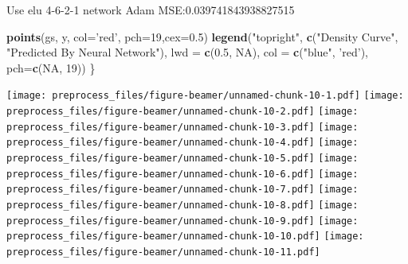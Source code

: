 \documentclass[ignorenonframetext,]{beamer}
\newenvironment{Shaded}{\begin{snugshade}}{\end{snugshade}}
\newcommand{\DataTypeTok}[1]{\textcolor[rgb]{0.13,0.29,0.53}{#1}}
\newcommand{\DecValTok}[1]{\textcolor[rgb]{0.00,0.00,0.81}{#1}}
\newcommand{\FloatTok}[1]{\textcolor[rgb]{0.00,0.00,0.81}{#1}}
\newcommand{\KeywordTok}[1]{\textcolor[rgb]{0.13,0.29,0.53}{\textbf{#1}}}
\newcommand{\NormalTok}[1]{#1}
\newcommand{\OtherTok}[1]{\textcolor[rgb]{0.56,0.35,0.01}{#1}}
\newcommand{\StringTok}[1]{\textcolor[rgb]{0.31,0.60,0.02}{#1}}
\begin{document}
\begin{frame}[fragile]{Use elu 4-6-2-1 network Adam
MSE:0.039741843938827515}
\begin{Shaded}
\begin{Highlighting}[]
  \KeywordTok{points}\NormalTok{(gs, y, }\DataTypeTok{col=}\StringTok{'red'}\NormalTok{, }\DataTypeTok{pch=}\DecValTok{19}\NormalTok{,}\DataTypeTok{cex=}\FloatTok{0.5}\NormalTok{)}
  \KeywordTok{legend}\NormalTok{(}\StringTok{"topright"}\NormalTok{, }\KeywordTok{c}\NormalTok{(}\StringTok{"Density Curve"}\NormalTok{, }\StringTok{"Predicted By Neural Network"}\NormalTok{), }\DataTypeTok{lwd =} \KeywordTok{c}\NormalTok{(}\FloatTok{0.5}\NormalTok{, }\OtherTok{NA}\NormalTok{), }\DataTypeTok{col =} \KeywordTok{c}\NormalTok{(}\StringTok{"blue"}\NormalTok{, }\StringTok{'red'}\NormalTok{), }\DataTypeTok{pch=}\KeywordTok{c}\NormalTok{(}\OtherTok{NA}\NormalTok{, }\DecValTok{19}\NormalTok{))}
\NormalTok{\}}
\end{Highlighting}
\end{Shaded}

\texttt{[image: preprocess\_files/figure-beamer/unnamed-chunk-10-1.pdf]}
\texttt{[image: preprocess\_files/figure-beamer/unnamed-chunk-10-2.pdf]}
\texttt{[image: preprocess\_files/figure-beamer/unnamed-chunk-10-3.pdf]}
\texttt{[image: preprocess\_files/figure-beamer/unnamed-chunk-10-4.pdf]}
\texttt{[image: preprocess\_files/figure-beamer/unnamed-chunk-10-5.pdf]}
\texttt{[image: preprocess\_files/figure-beamer/unnamed-chunk-10-6.pdf]}
\texttt{[image: preprocess\_files/figure-beamer/unnamed-chunk-10-7.pdf]}
\texttt{[image: preprocess\_files/figure-beamer/unnamed-chunk-10-8.pdf]}
\texttt{[image: preprocess\_files/figure-beamer/unnamed-chunk-10-9.pdf]}
\texttt{[image: preprocess\_files/figure-beamer/unnamed-chunk-10-10.pdf]}
\texttt{[image: preprocess\_files/figure-beamer/unnamed-chunk-10-11.pdf]}


\end{frame}
\end{document}
